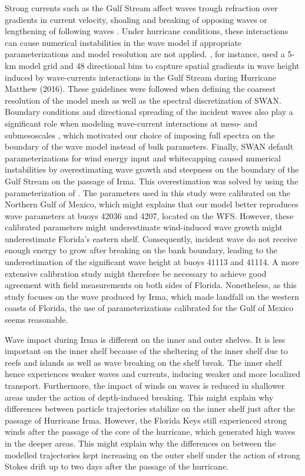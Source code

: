 \documentclass[preprint,12pt,authoryear]{elsarticle}
\begin{document}
Strong currents such as the Gulf Stream affect waves trough refraction over gradients in current velocity, shoaling and breaking of opposing waves or lengthening of following waves \citep{hegermiller2019wave}. Under hurricane conditions, these interactions can cause numerical instabilities in the wave model if appropriate parameterizations and model resolution are not applied. \cite{hegermiller2019wave}, for instance, used a 5-km model grid and 48 directional bins to capture spatial gradients in wave height induced by wave-currents interactions in the Gulf Stream during Hurricane Matthew (2016). These guidelines were followed when defining the coarsest resolution of the model mesh as well as the spectral discretization of SWAN. Boundary conditions and directional spreading of the incident waves also play a significant role when modeling wave-current interactions at meso- and submesoscales \citep{villas2020wave}, which motivated our choice of imposing full spectra on the boundary of the wave model instead of bulk parameters. Finally, SWAN default parameterizations for wind energy input and whitecapping caused numerical instabilities by overestimating wave growth and steepness on the boundary of the Gulf Stream on the passage of Irma. This overestimation was solved by using the parameterization of \cite{siadatmousavi2011evaluation}. The parameters used in this study were calibrated on the Northern Gulf of Mexico, which might explains that our model better reproduces wave parameters at buoys 42036 and 4207, located on the WFS. However, these calibrated parameters might underestimate wind-induced wave growth might underestimate Florida's eastern shelf. Consequently, incident wave do not receive enough energy to grow after breaking on the bank boundary, leading to the underestimation of the significant wave height at buoys 41113 and 41114. A more extensive calibration study might therefore be necessary to achieve good agreement with field measurements on both sides of Florida. Nonetheless, as this study focuses on the wave produced by Irma, which made landfall on the western coasts of Florida, the use of parameterizations calibrated for the Gulf of Mexico seems reasonable.

Wave impact during Irma is different on the inner and outer shelves. It is less important on the inner shelf because of the sheltering of the inner shelf due to reefs and islands as well as wave breaking on the shelf break. The inner shelf hence experiences weaker waves and currents, inducing weaker and more localized transport. Furthermore, the impact of winds on waves is reduced in shallower areas under the action of depth-induced breaking. This might explain why differences between particle trajectories stabilize on the inner shelf just after the passage of Hurricane Irma. However, the Florida Keys still experienced strong winds after the passage of the core of the hurricane, which generated high waves in the deeper areas. This might explain why the differences on between the modelled trajectories kept increasing on the outer shelf under the action of strong Stokes drift up to two days after the passage of the hurricane.
\end{document}
